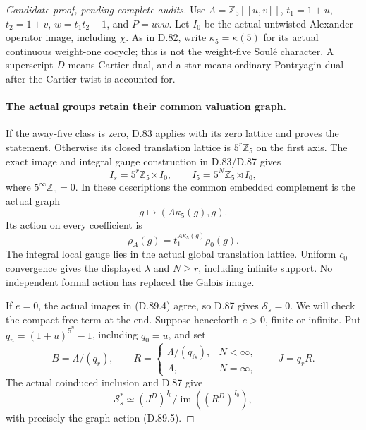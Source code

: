 \begin{proof}[Candidate proof, pending complete audits]
Use \(\Lambda=\mathbb Z_5[[u,v]]\), \(t_1=1+u\),
\(t_2=1+v\), \(w=t_1t_2-1\), and \(P=uvw\).
Let \(I_0\) be the actual untwisted Alexander operator image,
including \(\chi\). As in D.82, write \(\kappa_5=\kappa(5)\)
for its actual continuous weight-one cocycle; this is not the
weight-five Soul\'e character. A superscript \(D\) means
Cartier dual, and a star means ordinary Pontryagin dual after
the Cartier twist is accounted for.

\paragraph{The actual groups retain their common valuation graph.}
If the away-five class is zero, D.83 applies with its zero
lattice and proves the statement. Otherwise its closed
translation lattice is \(5^r\mathbb Z_5\) on the first axis.
The exact image and integral gauge construction in D.83/D.87
gives
\[
 I_s=5^r\mathbb Z_5\rtimes I_0,
 \qquad I_5=5^N\mathbb Z_5\rtimes I_0,                  \tag{D.89.4}
\]
where \(5^\infty\mathbb Z_5=0\). In these descriptions
the common embedded complement is the actual graph
\[
             g\longmapsto(A\kappa_5(g),g).
\]
Its action on every coefficient is
\[
                \rho_A(g)=t_1^{A\kappa_5(g)}\rho_0(g).
                                                               \tag{D.89.5}
\]
The integral local gauge lies in the actual global translation
lattice. Uniform \(c_0\) convergence gives the displayed
\(\lambda\) and \(N\ge r\), including infinite support.
No independent formal action has replaced the Galois image.

If \(e=0\), the actual images in (D.89.4) agree, so D.87
gives \(\mathcal S_s=0\). We will check the compact free
term at the end. Suppose henceforth \(e>0\), finite or infinite.
Put \(q_n=(1+u)^{5^n}-1\), including \(q_0=u\), and set
\[
 B=\Lambda/(q_r),\qquad
 R=\begin{cases}\Lambda/(q_N),&N<\infty,\\
                 \Lambda,&N=\infty,\end{cases}
 \qquad J=q_rR.                                         \tag{D.89.6}
\]
The actual coinduced inclusion and D.87 give
\[
 \mathcal S_s^*\simeq
       (J^D)^{I_0}/\operatorname{im}((R^D)^{I_0}),        \tag{D.89.7}
\]
with precisely the graph action (D.89.5).


\end{proof}
